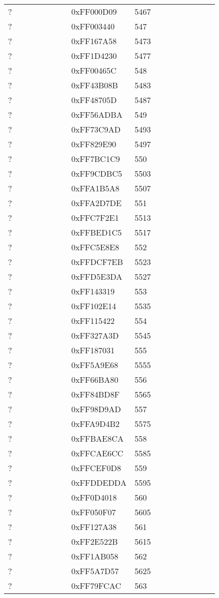 \begin{longtable}{p{0.3\linewidth} p{0.3\linewidth} p{0.4\linewidth}}
? &  0xFF000D09 &  5467\\
? &  0xFF003440 &  547\\
? &  0xFF167A58 &  5473\\
? &  0xFF1D4230 &  5477\\
? &  0xFF00465C &  548\\
? &  0xFF43B08B &  5483\\
? &  0xFF48705D &  5487\\
? &  0xFF56ADBA &  549\\
? &  0xFF73C9AD &  5493\\
? &  0xFF829E90 &  5497\\
? &  0xFF7BC1C9 &  550\\
? &  0xFF9CDBC5 &  5503\\
? &  0xFFA1B5A8 &  5507\\
? &  0xFFA2D7DE &  551\\
? &  0xFFC7F2E1 &  5513\\
? &  0xFFBED1C5 &  5517\\
? &  0xFFC5E8E8 &  552\\
? &  0xFFDCF7EB &  5523\\
? &  0xFFD5E3DA &  5527\\
? &  0xFF143319 &  553\\
? &  0xFF102E14 &  5535\\
? &  0xFF115422 &  554\\
? &  0xFF327A3D &  5545\\
? &  0xFF187031 &  555\\
? &  0xFF5A9E68 &  5555\\
? &  0xFF66BA80 &  556\\
? &  0xFF84BD8F &  5565\\
? &  0xFF98D9AD &  557\\
? &  0xFFA9D4B2 &  5575\\
? &  0xFFBAE8CA &  558\\
? &  0xFFCAE6CC &  5585\\
? &  0xFFCEF0D8 &  559\\
? &  0xFFDDEDDA &  5595\\
? &  0xFF0D4018 &  560\\
? &  0xFF050F07 &  5605\\
? &  0xFF127A38 &  561\\
? &  0xFF2E522B &  5615\\
? &  0xFF1AB058 &  562\\
? &  0xFF5A7D57 &  5625\\
? &  0xFF79FCAC &  563\\

\end{longtable}
